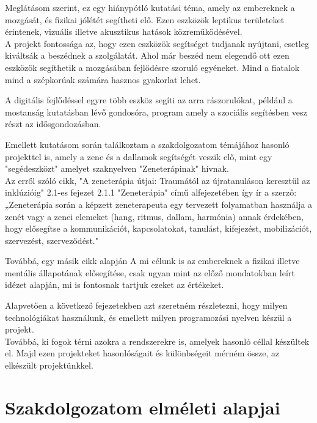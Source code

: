 \documentclass[tocnopagenum]{thesis-ekf}
\theoremstyle{definition}
\theoremstyle{remark}
\begin{document}
	Meglátásom szerint, ez egy hiánypótló kutatási téma, amely az embereknek a mozgását, és fizikai jólétét segítheti elő.
	Ezen eszközök leptikus területeket érintenek, vizuális illetve akusztikus hatások közreműködésével.
	\\
	A projekt fontossága az, hogy ezen eszközök segítséget tudjanak nyújtani, esetleg kiváltsák a beszédnek a szolgálatát. Ahol már beszéd nem elegendő ott ezen eszközök segíthetik a mozgásában fejlődésre szoruló egyéneket. Mind a fiatalok mind a szépkorúak számára hasznos gyakorlat lehet.
	\par
	A digitális fejlődéssel egyre több eszköz segíti az arra rászorulókat, például a mostanság kutatásban lévő gondosóra, program amely a szociális segítésben vesz részt az idősgondozásban.\cite{MTI}
	\par
	Emellett kutatásom során találkoztam a szakdolgozatom témájához hasonló projekttel is, amely a zene és a dallamok segítségét veszik elő, mint egy "segédeszközt" amelyet szaknyelven "Zeneterápinak" hívnak.\cite{zsofia2021zeneterapia}
	\\
	Az erről szóló cikk, "A zeneterápia útjai: Traumától az újratanuláson keresztül az inklúzióig" 2.1-es fejezet 2.1.1 "Zeneterápia" című alfejezetében így ír a szerző:
	„Zeneterápia során a képzett zeneterapeuta egy tervezett folyamatban használja a zenét vagy a zenei elemeket (hang, ritmus, dallam, harmónia) annak érdekében, hogy elősegítse a kommunikációt, kapcsolatokat, tanulást, kifejezést, mobilizációt, szervezést, szerveződést."
	\par
	Továbbá, egy másik cikk alapján \cite{erdelyiilonademensbetegek}
	A mi célunk is az embereknek a fizikai illetve mentális állapotának elősegítése, csak ugyan mint az előző mondatokban leírt idézet alapján, mi is fontosnak tartjuk ezeket az értékeket.
	\par 
	
	Alapvetően a következő fejezetekben azt szeretném részletezni, hogy milyen technológiákat használunk, és emellett milyen programozási nyelven készül a projekt. \\ 
	Továbbá, ki fogok térni azokra a rendszerekre is, amelyek hasonló céllal készültek el. Majd ezen projekteket hasonlóságait és különbségeit mérném össze, az elkészült projektünkkel. 
	

	\chapter{Szakdolgozatom elméleti alapjai}
\end{document}
